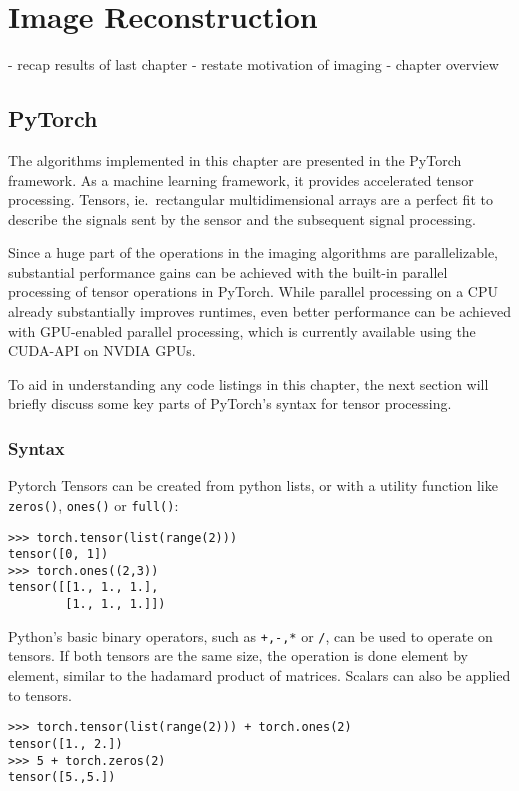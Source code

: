 \chapter{Image Reconstruction}
- recap results of last chapter
- restate motivation of imaging
- chapter overview

\section{PyTorch}
The algorithms implemented in this chapter are presented in the PyTorch framework.
As a machine learning framework, it provides accelerated tensor processing.
Tensors, ie.\ rectangular multidimensional arrays are a perfect fit to
describe the signals sent by the sensor and the subsequent signal processing.

Since a huge part of the operations in the imaging algorithms are parallelizable,
substantial performance gains can be achieved with the built-in parallel processing
of tensor operations in PyTorch.
While parallel processing on a CPU already substantially improves runtimes,
even better performance can be achieved with GPU-enabled parallel processing,
which is currently available using the CUDA-API on NVDIA GPUs.

To aid in understanding any code listings in this chapter,
the next section will briefly discuss some key parts of PyTorch's syntax for tensor processing.

\subsection{Syntax}
Pytorch Tensors can be created from python lists,
or with a utility function like \verb|zeros()|, \verb|ones()| or \verb|full()|:
\begin{lstlisting}
>>> torch.tensor(list(range(2)))
tensor([0, 1])
>>> torch.ones((2,3))
tensor([[1., 1., 1.],
        [1., 1., 1.]])
\end{lstlisting}

Python's basic binary operators, such as \verb|+,-,*| or \verb|/|, can be used to operate on tensors.
If both tensors are the same size, the operation is done element by element, similar to the hadamard product of matrices.
Scalars can also be applied to tensors.
\begin{lstlisting}
>>> torch.tensor(list(range(2))) + torch.ones(2)
tensor([1., 2.])
>>> 5 + torch.zeros(2)
tensor([5.,5.])
\end{lstlisting}

